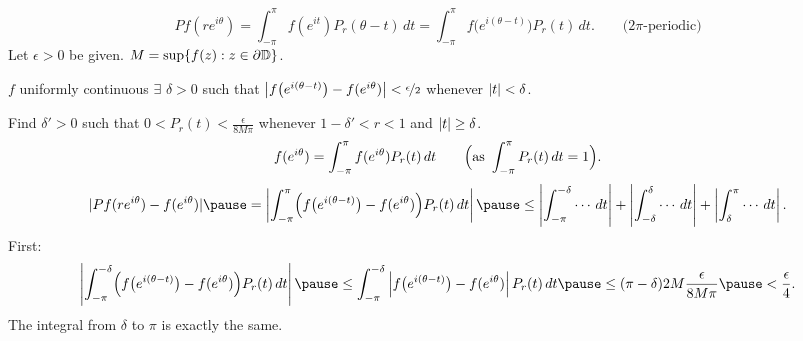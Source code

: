 \documentclass[10pt,aspectratio=169]{beamer}
\begin{document}
\begin{frame}
\[
Pf(re^{i\theta})
=
\int_{-\pi}^\pi f(e^{it}) P_r(\theta-t) \, dt
=
\int_{-\pi}^\pi f\bigl(e^{i(\theta-t)}\bigr) P_r(t) \, dt .
\qquad \text{($2\pi$-periodic)}
\]
\pause
Let $\epsilon > 0$ be given.
\pause
\quad
$M = \sup \{ f(z) : z \in \partial {\mathbb{D}} \}$.
\pause

$f$ uniformly continuous \pause \wthus $\exists$ $\delta > 0$
such that $\left\lvert {f\bigl(e^{i(\theta-t)}\bigr)-f(e^{i\theta})} \right\rvert <
\nicefrac{\epsilon}{2}$ whenever $\lvert {t} \rvert < \delta$.

\pause
\medskip

Find 
$\delta' > 0$ such that
\quad $0 < P_r(t) < \frac{\epsilon}{8M\pi}$ \quad
whenever
$1-\delta' < r < 1$ and $\lvert {t} \rvert \geq \delta$.
\pause
\[
f(e^{i\theta})=
\int_{-\pi}^\pi f(e^{i\theta}) P_r(t) \, dt 
\qquad \Bigl(\text{as} \ \int_{-\pi}^\pi P_r(t) \, dt = 1\Bigr).
\]
\pause
\[
\sabs{
Pf(r e^{i\theta} ) - f(e^{i\theta})
}
\pause
=
\abs{
\int_{-\pi}^{\pi} \Bigl( f\bigl(e^{i(\theta-t)}\bigr)-f(e^{i\theta}) \Bigr) P_r(t) \, dt
}
\pause
\leq 
\abs{
\int_{-\pi}^{-\delta} \cdots \, dt
}
+
\abs{
\int_{-\delta}^{\delta} \cdots \, dt
}
+
\abs{
\int_{\delta}^\pi \cdots \, dt
} .
\]
\pause
First:
\begin{equation*}
\abs{
\int_{-\pi}^{-\delta} \Bigl( f\bigl(e^{i(\theta-t)}\bigr)-f(e^{i\theta}) \Bigr) P_r(t) \, dt
}
\pause
\leq
\int_{-\pi}^{-\delta} \abs{ f\bigl(e^{i(\theta-t)}\bigr)-f(e^{i\theta}) }
P_r(t) \, dt
\pause
\leq (\pi-\delta) 2M \frac{\epsilon}{8M\pi}
\pause
< \frac{\epsilon}{4} .
\end{equation*}
\pause
The integral from $\delta$ to $\pi$ is exactly the same.
\end{frame}
\end{document}
